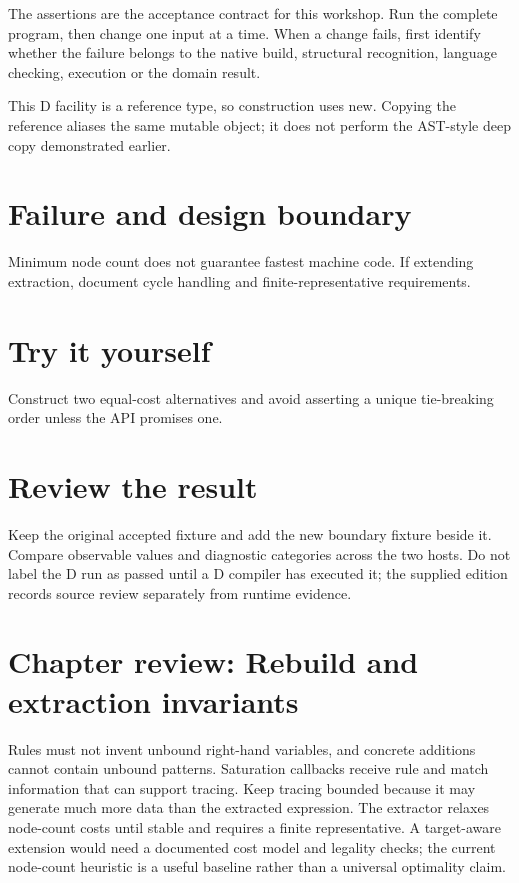 The assertions are the acceptance contract for this workshop. Run the complete program, then change one input at a time. When a change fails, first identify whether the failure belongs to the native build, structural recognition, language checking, execution or the domain result.

\clearpage
{}
This D facility is a reference type, so construction uses new. Copying the reference aliases the same mutable object; it does not perform the AST-style deep copy demonstrated earlier.


\section*{Failure and design boundary}
Minimum node count does not guarantee fastest machine code. If extending extraction, document cycle handling and finite-representative requirements.

\section*{Try it yourself}
Construct two equal-cost alternatives and avoid asserting a unique tie-breaking order unless the API promises one.

\section*{Review the result}
Keep the original accepted fixture and add the new boundary fixture beside it. Compare observable values and diagnostic categories across the two hosts. Do not label the D run as passed until a D compiler has executed it; the supplied edition records source review separately from runtime evidence.

\clearpage
\section*{Chapter review: Rebuild and extraction invariants}
Rules must not invent unbound right-hand variables, and concrete additions cannot contain unbound patterns. Saturation callbacks receive rule and match information that can support tracing. Keep tracing bounded because it may generate much more data than the extracted expression. The extractor relaxes node-count costs until stable and requires a finite representative. A target-aware extension would need a documented cost model and legality checks; the current node-count heuristic is a useful baseline rather than a universal optimality claim.

